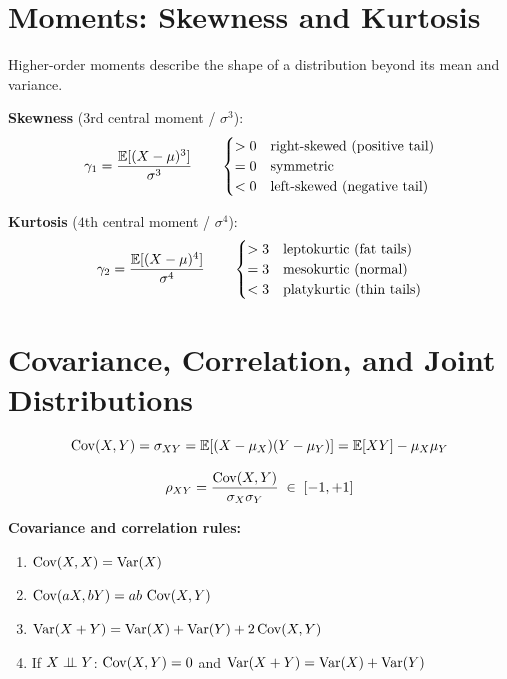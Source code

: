 \section{Moments: Skewness and Kurtosis}
\label{sec_Moments}

Higher-order moments describe the shape of a distribution beyond its mean and
variance.

\noindent\textbf{Skewness} ($3$rd central moment / $\sigma^3$):
\begin{equation}
  \gamma_1 = \frac{\mathbb{E}[(X-\mu)^3]}{\sigma^3}
  \qquad
  \begin{cases} > 0 & \text{right-skewed (positive tail)} \\
                = 0 & \text{symmetric} \\
                < 0 & \text{left-skewed (negative tail)}
  \end{cases}
\end{equation}

\noindent\textbf{Kurtosis} ($4$th central moment / $\sigma^4$):
\begin{equation}
  \gamma_2 = \frac{\mathbb{E}[(X-\mu)^4]}{\sigma^4}
  \qquad
  \begin{cases} > 3 & \text{leptokurtic (fat tails)} \\
                = 3 & \text{mesokurtic (normal)} \\
                < 3 & \text{platykurtic (thin tails)}
  \end{cases}
\end{equation}


\section{Covariance, Correlation, and Joint Distributions}
\label{sec_CovCorr}

\begin{equation}
  \operatorname{Cov}(X,Y) = \sigma_{XY} = \mathbb{E}[(X-\mu_X)(Y-\mu_Y)]
             = \mathbb{E}[XY] - \mu_X\mu_Y
\end{equation}

\begin{equation}
  \rho_{XY} = \frac{\operatorname{Cov}(X,Y)}{\sigma_X \sigma_Y} \;\in\; [-1,+1]
\end{equation}

\noindent\textbf{Covariance and correlation rules:}
\begin{enumerate}[label=(\roman*)]
  \item $\operatorname{Cov}(X,X) = \operatorname{Var}(X)$
  \item $\operatorname{Cov}(aX,bY) = ab\,\operatorname{Cov}(X,Y)$
  \item $\operatorname{Var}(X+Y) = \operatorname{Var}(X) + \operatorname{Var}(Y) + 2\operatorname{Cov}(X,Y)$
  \item If $X \perp\!\!\!\perp Y$: $\operatorname{Cov}(X,Y) = 0$ and $\operatorname{Var}(X+Y) = \operatorname{Var}(X)+\operatorname{Var}(Y)$
\end{enumerate}

